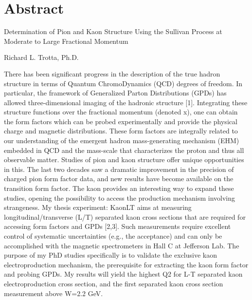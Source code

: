 \chapter[Abstract]{Abstract}

\begin{center}
Determination of Pion and Kaon Structure Using the Sullivan Process at Moderate to Large Fractional Momentum

Richard L. Trotta, Ph.D.
\end{center}

There has been significant progress in the description of the true hadron structure in terms of Quantum ChromoDynamics (QCD) degrees of freedom. In particular, the framework of Generalized Parton Distributions (GPDs) has allowed three-dimensional imaging of the hadronic structure {[1]}. Integrating these structure functions over the fractional momentum (denoted x), one can obtain the form factors which can be probed experimentally and provide the physical charge and magnetic distributions. These form factors are integrally related to our understanding of the emergent hadron mass-generating mechanism (EHM) embedded in QCD and the mass-scale that characterizes the proton and thus all observable matter. Studies of pion and kaon structure offer unique opportunities in this. The last two decades saw a dramatic improvement in the precision of charged pion form factor data, and new results have become available on the transition form factor. The kaon provides an interesting way to expand these studies, opening the possibility to access the production mechanism involving strangeness. My thesis experiment: KaonLT aims at measuring longitudinal\slash transverse (L\slash T) separated kaon cross sections that are required for accessing form factors and GPDs {[2,3]}. Such measurements require excellent control of systematic uncertainties (e.g., the acceptance) and can only be accomplished with the magnetic spectrometers in Hall C at Jefferson Lab. The purpose of my PhD studies specifically is to validate the exclusive kaon electroproduction mechanism, the prerequisite for extracting the kaon form factor and probing GPDs. My results will yield the highest Q2 for L-T separated kaon electroproduction cross section, and the first separated kaon cross section measurement above W=2.2 GeV.

